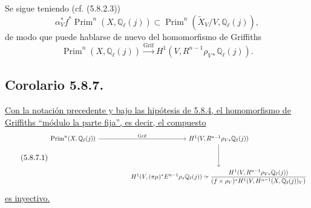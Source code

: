 \pageoriginale

Se sigue teniendo (cf. (5.8.2.3))
\begin{equation}\tag{5.8.6.3}
\alpha_V^*f^*\operatorname{Prim}^n(X,\mathbb Q_\ell(j))
\subset
\operatorname{Prim}^n(\widetilde X_V/V,\mathbb Q_\ell(j)),
\end{equation}
de modo que puede hablarse de nuevo del homomorfismo de Griffiths
\begin{equation}\tag{5.8.6.4}
\operatorname{Prim}^n(X,\mathbb Q_\ell(j))
\xrightarrow{\operatorname{Grif}}
H^1(V,R^{n-1}\rho_{V*}\mathbb Q_\ell(j)).
\end{equation}

\subsection*{Corolario 5.8.7.}
\underline{Con la notación precedente y bajo las hipótesis de 5.8.4,
el homomorfismo de Griffiths ``módulo la parte fija'', es decir, el
compuesto}
\begin{equation}\tag{5.8.7.1}
\resizebox{\textwidth}{!}{%
\begin{tikzcd}[ampersand replacement=\&,column sep=huge,row sep=huge]
\operatorname{Prim}^n(X,\mathbb Q_\ell(j))
  \arrow[r,"\operatorname{Grif}"]
\& H^1(V,R^{n-1}\rho_{V*}\mathbb Q_\ell(j)) \arrow[d] \\
{}
\& H^1(V,(\pi\mu)^*E^{n-1}\rho_*\mathbb Q_\ell(j))
\simeq
\dfrac{H^1(V,R^{n-1}\rho_{V*}\mathbb Q_\ell(j))}
{(f\times\rho_V)^*H^1(V,H^{n-1}(X,\mathbb Q_\ell(j))_V)}
\end{tikzcd}}
\end{equation}
\underline{es inyectivo.}

\pageoriginale


